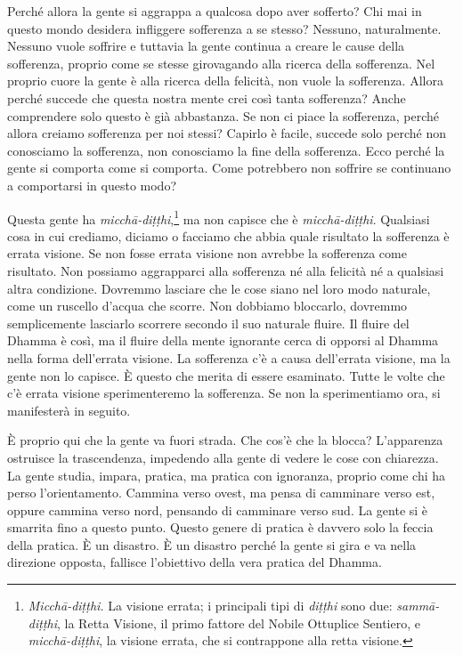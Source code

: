 Perché allora la gente si aggrappa a qualcosa dopo aver sofferto? Chi
mai in questo mondo desidera infliggere sofferenza a se stesso? Nessuno,
naturalmente. Nessuno vuole soffrire e tuttavia la gente continua a
creare le cause della sofferenza, proprio come se stesse girovagando
alla ricerca della sofferenza. Nel proprio cuore la gente è alla ricerca
della felicità, non vuole la sofferenza. Allora perché succede che
questa nostra mente crei così tanta sofferenza? Anche comprendere solo
questo è già abbastanza. Se non ci piace la sofferenza, perché allora
creiamo sofferenza per noi stessi? Capirlo è facile, succede solo perché
non conosciamo la sofferenza, non conosciamo la fine della sofferenza.
Ecco perché la gente si comporta come si comporta. Come potrebbero non
soffrire se continuano a comportarsi in questo modo?

Questa gente ha \emph{micchā-diṭṭhi},\footnote{\emph{Micchā-diṭṭhi.} La
  visione errata; i principali tipi di \emph{diṭṭhi} sono due:
  \emph{sammā-diṭṭhi}, la Retta Visione, il primo fattore del Nobile
  Ottuplice Sentiero, e \emph{micchā-diṭṭhi}, la visione errata, che si
  contrappone alla retta visione.} ma non capisce che è
\emph{micchā-diṭṭhi}. Qualsiasi cosa in cui crediamo, diciamo o facciamo
che abbia quale risultato la sofferenza è errata visione. Se non fosse
errata visione non avrebbe la sofferenza come risultato. Non possiamo
aggrapparci alla sofferenza né alla felicità né a qualsiasi altra
condizione. Dovremmo lasciare che le cose siano nel loro modo naturale,
come un ruscello d'acqua che scorre. Non dobbiamo bloccarlo, dovremmo
semplicemente lasciarlo scorrere secondo il suo naturale fluire. Il
fluire del Dhamma è così, ma il fluire della mente ignorante cerca di
opporsi al Dhamma nella forma dell'errata visione. La sofferenza c'è a
causa dell'errata visione, ma la gente non lo capisce. È questo che
merita di essere esaminato. Tutte le volte che c'è errata visione
sperimenteremo la sofferenza. Se non la sperimentiamo ora, si
manifesterà in seguito.

È proprio qui che la gente va fuori strada. Che cos'è che la blocca?
L'apparenza ostruisce la trascendenza, impedendo alla gente di vedere le
cose con chiarezza. La gente studia, impara, pratica, ma pratica con
ignoranza, proprio come chi ha perso l'orientamento. Cammina verso
ovest, ma pensa di camminare verso est, oppure cammina verso nord,
pensando di camminare verso sud. La gente si è smarrita fino a questo
punto. Questo genere di pratica è davvero solo la feccia della pratica.
È un disastro. È un disastro perché la gente si gira e va nella
direzione opposta, fallisce l'obiettivo della vera pratica del Dhamma.

